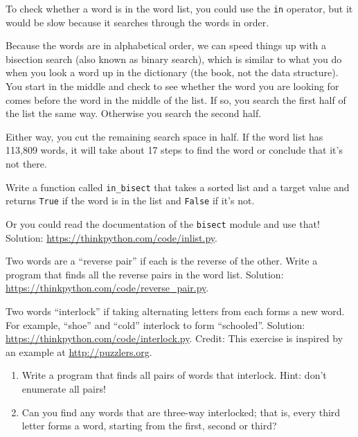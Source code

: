 \documentclass[10pt]{book}
\begin{document}
\begin{exercise}
\label{wordlist1}
\label{bisection}

To check whether a word is in the word list, you could use
the {\tt in} operator, but it would be slow because it searches
through the words in order.

Because the words are in alphabetical order, we can speed things up
with a bisection search (also known as binary search), which is
similar to what you do when you look a word up in the dictionary (the book, not the data structure).  You
start in the middle and check to see whether the word you are looking
for comes before the word in the middle of the list.  If so, you
search the first half of the list the same way.  Otherwise you search
the second half.

Either way, you cut the remaining search space in half.  If the
word list has 113,809 words, it will take about 17 steps to
find the word or conclude that it's not there.

Write a function called \verb"in_bisect" that takes a sorted list
and a target value and returns {\tt True} if the word is
in the list and {\tt False} if it's not.

Or you could read the documentation of the {\tt bisect} module
and use that!  Solution: \url{https://thinkpython.com/code/inlist.py}.

\end{exercise}

\begin{exercise}

Two words are a ``reverse pair'' if each is the reverse of the
other.  Write a program that finds all the reverse pairs in the
word list.  Solution: \url{https://thinkpython.com/code/reverse_pair.py}.

\end{exercise}

\begin{exercise}

Two words ``interlock'' if taking alternating letters from each forms
a new word.  For example, ``shoe'' and ``cold''
interlock to form ``schooled''.
Solution: \url{https://thinkpython.com/code/interlock.py}.
Credit: This exercise is inspired by an example at \url{http://puzzlers.org}.

\begin{enumerate}

\item Write a program that finds all pairs of words that interlock.
  Hint: don't enumerate all pairs!

\item Can you find any words that are three-way interlocked; that is,
  every third letter forms a word, starting from the first, second or
  third?

\end{enumerate}
\end{exercise}
\end{document}
